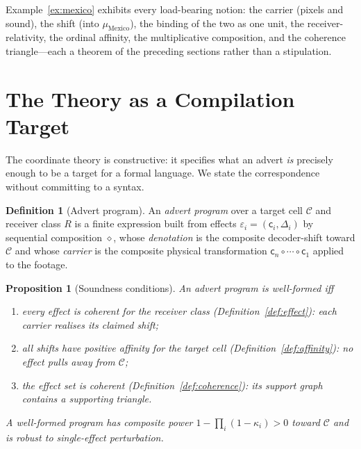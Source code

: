 \documentclass[twocolumn,11pt,a4paper]{article}
\theoremstyle{adv}
\newtheorem{proposition}[theorem]{Proposition}
\theoremstyle{definition}
\newtheorem{definition}[theorem]{Definition}
\theoremstyle{remark}
\newcommand{\Cell}{\mathcal{C}}        %
\newcommand{\Recv}{R}                  %
\newcommand{\Eff}{\varepsilon}        %
\newcommand{\Carrier}{\kappa}         %
\renewcommand{\Carrier}{\mathsf{c}}
\newcommand{\shift}{\Delta}            %
\newcommand{\pot}{\kappa}             %
\begin{document}
Example~\ref{ex:mexico} exhibits every load-bearing notion: the carrier
(pixels and sound), the shift (into $\mu_{\text{Mexico}}$), the binding of
the two as one unit, the receiver-relativity, the ordinal affinity, the
multiplicative composition, and the coherence triangle---each a theorem of
the preceding sections rather than a stipulation.

\section{The Theory as a Compilation Target}
\label{sec:compilation}

The coordinate theory is constructive: it specifies what an advert
\emph{is} precisely enough to be a target for a formal language. We state
the correspondence without committing to a syntax.

\begin{definition}[Advert program]
\label{def:program}
An \emph{advert program} over a target cell $\Cell$ and receiver class
$\Recv$ is a finite expression built from effects
$\Eff_i=(\Carrier_i,\shift_i)$ by sequential composition $\diamond$, whose
\emph{denotation} is the composite decoder-shift toward $\Cell$ and whose
\emph{carrier} is the composite physical transformation
$\Carrier_n\circ\cdots\circ\Carrier_1$ applied to the footage.
\end{definition}

\begin{proposition}[Soundness conditions]
\label{prop:soundness}
An advert program is \emph{well-formed} iff
\begin{enumerate}[label=(\roman*),leftmargin=1.8em,itemsep=1pt]
\item every effect is coherent for the receiver class
  (Definition~\ref{def:effect}): each carrier realises its claimed shift;
\item all shifts have positive affinity for the target cell
  (Definition~\ref{def:affinity}): no effect pulls away from $\Cell$;
\item the effect set is coherent (Definition~\ref{def:coherence}): its
  support graph contains a supporting triangle.
\end{enumerate}
A well-formed program has composite power $1-\prod_i(1-\pot_i)>0$ toward
$\Cell$ and is robust to single-effect perturbation.
\end{proposition}
\end{document}
